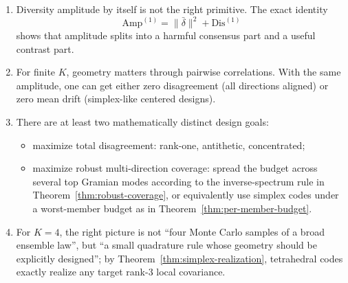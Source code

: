 \documentclass[11pt]{article}
\theoremstyle{remark}
\begin{document}
\begin{enumerate}
\item Diversity amplitude by itself is not the right primitive. The exact identity
\[
\mathrm{Amp}^{(1)}=\|\bar\delta\|^2+\mathrm{Dis}^{(1)}
\]
shows that amplitude splits into a harmful consensus part and a useful contrast part.
\item For finite $K$, geometry matters through pairwise correlations. With the same amplitude, one can get either zero disagreement (all directions aligned) or zero mean drift (simplex-like centered designs).
\item There are at least two mathematically distinct design goals:
\begin{itemize}
\item maximize total disagreement: rank-one, antithetic, concentrated;
\item maximize robust multi-direction coverage: spread the budget across several top Gramian modes according to the inverse-spectrum rule in Theorem~\ref{thm:robust-coverage}, or equivalently use simplex codes under a worst-member budget as in Theorem~\ref{thm:per-member-budget}.
\end{itemize}
\item For $K=4$, the right picture is not ``four Monte Carlo samples of a broad ensemble law'', but ``a small quadrature rule whose geometry should be explicitly designed''; by Theorem~\ref{thm:simplex-realization}, tetrahedral codes exactly realize any target rank-$3$ local covariance.
\end{enumerate}
\end{document}
